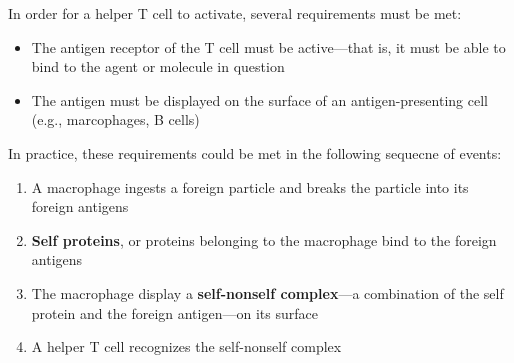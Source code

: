 \documentclass{article}
\begin{document}
In order for a helper T cell to activate, several requirements must be met:

\begin{itemize}
	\item The antigen receptor of the T cell must be active---that is, it must
		be able to bind to the agent or molecule in question
	\item The antigen must be displayed on the surface of an antigen-presenting
		cell (e.g., marcophages, B cells)
\end{itemize}

In practice, these requirements could be met in the following sequecne of
events:

\begin{enumerate}
	\item A macrophage ingests a foreign particle and breaks the particle into
		its foreign antigens
	\item \textbf{Self proteins}, or proteins belonging to the macrophage bind
		to the foreign antigens
	\item The macrophage display a \textbf{self-nonself complex}---a
		combination of the self protein and the foreign antigen---on its
		surface
	\item A helper T cell recognizes the self-nonself complex
\end{enumerate}
\end{document}
